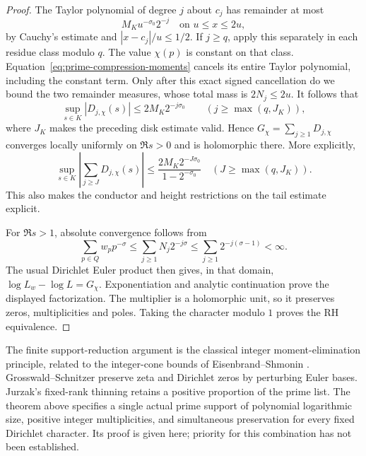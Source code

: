 \documentclass[11pt]{article}
\theoremstyle{definition}
\begin{document}
\begin{proof}
The Taylor polynomial of degree $j$ about $c_j$ has remainder
at most
\[
 M_Ku^{-\sigma_0}2^{-j}
 \quad\text{on }u\le x\le2u,
\]
by Cauchy's estimate and $|x-c_j|/u\le1/2$.
If $j\ge q$, apply this separately in each residue class
modulo $q$. The value $\chi(p)$ is constant on that class.
Equation~\eqref{eq:prime-compression-moments} cancels its
entire Taylor polynomial, including the constant term.
Only after this exact signed cancellation do we bound the
two remainder measures, whose total mass is $2N_j\le2u$.
It follows that
\[
 \sup_{s\in K}|D_{j,\chi}(s)|
 \le2M_K2^{-j\sigma_0}
 \qquad(j\ge\max(q,J_K)),
\]
where $J_K$ makes the preceding disk estimate valid. Hence
$G_\chi=\sum_{j\ge1}D_{j,\chi}$ converges locally uniformly
on $\Re s>0$ and is holomorphic there. More explicitly,
\[
 \sup_{s\in K}\left|\sum_{j\ge J}D_{j,\chi}(s)\right|
 \le\frac{2M_K2^{-J\sigma_0}}{1-2^{-\sigma_0}}
 \quad(J\ge\max(q,J_K)).
\]
This also makes the conductor and height restrictions on the
tail estimate explicit.

For $\Re s>1$, absolute convergence follows from
\[
 \sum_{p\in Q}w_pp^{-\sigma}
 \le\sum_{j\ge1}N_j2^{-j\sigma}
 \le\sum_{j\ge1}2^{-j(\sigma-1)}<\infty.
\]
The usual Dirichlet Euler product then gives, in that domain,
$\log L_w-\log L=G_\chi$. Exponentiation and analytic
continuation prove the displayed factorization. The multiplier
is a holomorphic unit, so it preserves zeros, multiplicities
and poles. Taking the character modulo $1$ proves the RH
equivalence.
\end{proof}

The finite support-reduction argument is the classical integer
moment-elimination principle, related to the integer-cone
bounds of Eisenbrand--Shmonin \cite{EisenbrandShmonin}.
Grosswald--Schnitzer \cite{GrosswaldSchnitzer} preserve zeta
and Dirichlet zeros by perturbing Euler bases. Jurzak's
fixed-rank thinning retains a positive proportion of the prime
list. The theorem above specifies a single actual prime
support of polynomial logarithmic size, positive integer
multiplicities, and simultaneous preservation for every fixed
Dirichlet character. Its proof is given here; priority for this
combination has not been established.
\end{document}
